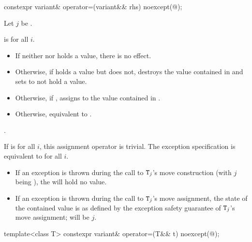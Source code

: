 %
\begin{itemdecl}
constexpr variant& operator=(variant&& rhs) noexcept(@\seebelow@);
\end{itemdecl}

\begin{itemdescr}
\pnum
Let $j$ be .

\pnum
\constraints
{}
 is
 for all $i$.

\pnum
\effects
\begin{itemize}
\item
If neither  nor  holds a value, there is no effect.
\item
Otherwise, if  holds a value but  does not, destroys the value
contained in  and sets  to not hold a value.
\item
Otherwise, if , assigns  to
the value contained in .
\item
Otherwise, equivalent to .
\end{itemize}

\pnum
\returns
{}.

\pnum
\remarks
If 
is  for all $i$, this assignment operator is trivial.
The exception specification is equivalent to
 for all $i$.
\begin{itemize}
\item If an exception is thrown during the call to $\texttt{T}_j$'s move construction
(with $j$ being ), the  will hold no value.
\item If an exception is thrown during the call to $\texttt{T}_j$'s move assignment,
the state of the contained value is as defined by the exception safety
guarantee of $\texttt{T}_j$'s move assignment;  will be $j$.
\end{itemize}
\end{itemdescr}

%
\begin{itemdecl}
template<class T> constexpr variant& operator=(T&& t) noexcept(@\seebelow@);
\end{itemdecl}

